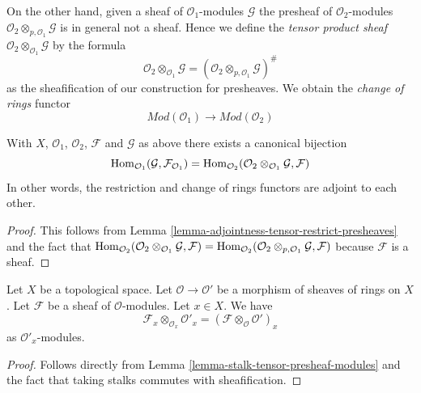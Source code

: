 \medskip\noindent
On the other hand, given a sheaf of $\mathcal{O}_1$-modules
$\mathcal{G}$ the presheaf of $\mathcal{O}_2$-modules
$\mathcal{O}_2 \otimes_{p, \mathcal{O}_1} \mathcal{G}$
is in general not a sheaf. Hence we define the
{\it tensor product sheaf}
$\mathcal{O}_2 \otimes_{\mathcal{O}_1} \mathcal{G}$
by the formula
$$
\mathcal{O}_2 \otimes_{\mathcal{O}_1} \mathcal{G}
=
(\mathcal{O}_2 \otimes_{p, \mathcal{O}_1} \mathcal{G})^\#
$$
as the sheafification of our construction for presheaves.
We obtain the {\it change of rings} functor
$$
\textit{Mod}(\mathcal{O}_1)
\longrightarrow
\textit{Mod}(\mathcal{O}_2)
$$

\begin{lemma}
\label{lemma-adjointness-tensor-restrict}
With $X$, $\mathcal{O}_1$, $\mathcal{O}_2$, $\mathcal{F}$ and
$\mathcal{G}$ as above there exists a canonical bijection
$$
\mathop{\mathrm{Hom}}\nolimits_{\mathcal{O}_1}(\mathcal{G}, \mathcal{F}_{\mathcal{O}_1})
=
\mathop{\mathrm{Hom}}\nolimits_{\mathcal{O}_2}(
\mathcal{O}_2 \otimes_{\mathcal{O}_1} \mathcal{G},
\mathcal{F}
)
$$
In other words, the restriction and change of rings functors
are adjoint to each other.
\end{lemma}

\begin{proof}
This follows from
Lemma \ref{lemma-adjointness-tensor-restrict-presheaves}
and the fact that
$\mathop{\mathrm{Hom}}\nolimits_{\mathcal{O}_2}(
\mathcal{O}_2 \otimes_{\mathcal{O}_1} \mathcal{G},
\mathcal{F}
)
=
\mathop{\mathrm{Hom}}\nolimits_{\mathcal{O}_2}(
\mathcal{O}_2 \otimes_{p, \mathcal{O}_1} \mathcal{G},
\mathcal{F}
)$
because $\mathcal{F}$ is a sheaf.
\end{proof}

\begin{lemma}
\label{lemma-stalk-tensor-sheaf-modules}
Let $X$ be a topological space.
Let $\mathcal{O} \to \mathcal{O}'$ be a morphism of
sheaves of rings on $X$.
Let $\mathcal{F}$ be a sheaf of $\mathcal{O}$-modules.
Let $x \in X$. We have
$$
\mathcal{F}_x \otimes_{\mathcal{O}_x} \mathcal{O}'_x
=
(\mathcal{F} \otimes_\mathcal{O} \mathcal{O}')_x
$$
as $\mathcal{O}'_x$-modules.
\end{lemma}

\begin{proof}
Follows directly from Lemma \ref{lemma-stalk-tensor-presheaf-modules}
and the fact that taking stalks commutes with sheafification.
\end{proof}


















